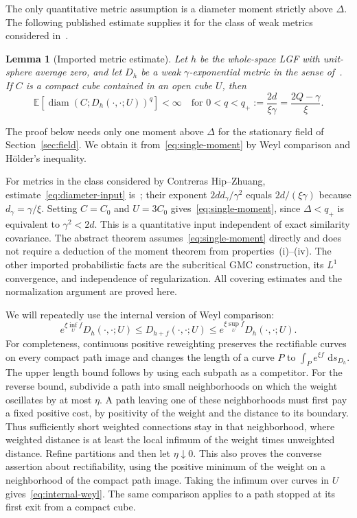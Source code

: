 \documentclass[11pt,letterpaper]{article}
\newcommand{\E}{\mathbb E}
\newcommand{\dd}{\,\mathrm d}
\DeclareMathOperator{\diam}{diam}
\newtheorem{lemma}[theorem]{Lemma}
\theoremstyle{definition}
\theoremstyle{remark}
\numberwithin{equation}{section}
\begin{document}
The only quantitative metric assumption is a diameter moment strictly above $\Delta$. The following published estimate supplies it for the class of weak metrics considered in~\cite{CZ}.

\begin{lemma}[Imported metric estimate]\label{lem:input-moment}
Let $h$ be the whole-space LGF with unit-sphere average zero, and let $D_h$ be a weak $\gamma$-exponential metric in the sense of~\cite{CZ}. If $C$ is a compact cube contained in an open cube $U$, then
\begin{equation}\label{eq:diameter-input}
 \E\!\left[\diam(C;D_h(\cdot,\cdot;U))^q\right]<\infty
 \quad\text{for }0<q<q_+:=\frac{2d}{\xi\gamma}
                         =\frac{2Q-\gamma}{\xi}.
\end{equation}
\end{lemma}

The proof below needs only one moment above $\Delta$ for the stationary field of Section~\ref{sec:field}. We obtain it from~\eqref{eq:single-moment} by Weyl comparison and H\"older's inequality.

For metrics in the class considered by Contreras Hip--Zhuang, estimate~\eqref{eq:diameter-input} is~\cite[Theorem~1.4(1) and Proposition~4.11]{CZ}; their exponent $2d d_\gamma/\gamma^2$ equals $2d/(\xi\gamma)$ because $d_\gamma=\gamma/\xi$. Setting $C=C_0$ and $U=3C_0$ gives~\eqref{eq:single-moment}, since $\Delta<q_+$ is equivalent to $\gamma^2<2d$. This is a quantitative input independent of exact similarity covariance. The abstract theorem assumes~\eqref{eq:single-moment} directly and does not require a deduction of the moment theorem from properties~\textup{(i)--(iv)}. The other imported probabilistic facts are the subcritical GMC construction, its $L^1$ convergence, and independence of regularization. All covering estimates and the normalization argument are proved here.

We will repeatedly use the internal version of Weyl comparison:
\begin{equation}\label{eq:internal-weyl}
 e^{\xi\inf_U f}D_h(\cdot,\cdot;U)
 \le D_{h+f}(\cdot,\cdot;U)
 \le e^{\xi\sup_U f}D_h(\cdot,\cdot;U).
\end{equation}
For completeness, continuous positive reweighting preserves the rectifiable curves on every compact path image and changes the length of a curve $P$ to $\int_Pe^{\xi f}\,\dd s_{D_h}$. The upper length bound follows by using each subpath as a competitor. For the reverse bound, subdivide a path into small neighborhoods on which the weight oscillates by at most $\eta$. A path leaving one of these neighborhoods must first pay a fixed positive cost, by positivity of the weight and the distance to its boundary. Thus sufficiently short weighted connections stay in that neighborhood, where weighted distance is at least the local infimum of the weight times unweighted distance. Refine partitions and then let $\eta\downarrow0$. This also proves the converse assertion about rectifiability, using the positive minimum of the weight on a neighborhood of the compact path image. Taking the infimum over curves in $U$ gives~\eqref{eq:internal-weyl}. The same comparison applies to a path stopped at its first exit from a compact cube.
\end{document}
